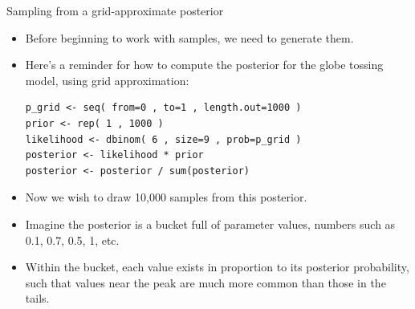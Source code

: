 \documentclass[handout]{beamer}
\begin{document}
\begin{frame}[fragile]{Sampling from a grid-approximate posterior}
\scriptsize{
\begin{itemize}

\item Before beginning to work with samples, we need to generate them.

\item Here’s a reminder for how to compute the posterior for the globe tossing model, using grid approximation:

\begin{verbatim}
p_grid <- seq( from=0 , to=1 , length.out=1000 )
prior <- rep( 1 , 1000 )
likelihood <- dbinom( 6 , size=9 , prob=p_grid )
posterior <- likelihood * prior
posterior <- posterior / sum(posterior)
\end{verbatim}

\item Now we wish to draw 10,000 samples from this posterior. 

\item Imagine the posterior is a bucket full of parameter values, numbers such as 0.1, 0.7, 0.5, 1, etc.

\item Within the bucket, each value exists in proportion to its posterior probability, such that values near the peak are much more common than those in the tails. 
 
\end{itemize}



} 

\end{frame}
\end{document}
